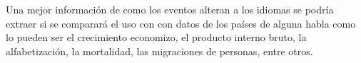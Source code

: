 Una mejor información de como los eventos alteran a los idiomas se podría extraer si se comparará el uso con con  datos de los países de alguna habla como lo pueden ser  el crecimiento economizo, el producto interno bruto, la alfabetización, la mortalidad, las migraciones de personas, entre otros. 



 





